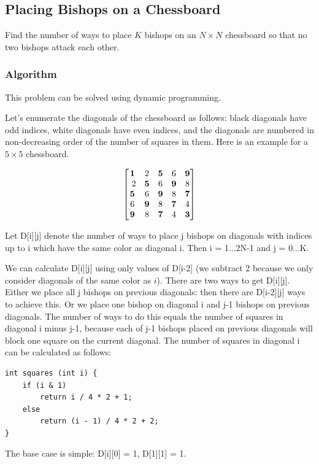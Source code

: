 \documentclass[8pt, a4paper, oneside, twocolumn]{extarticle}
\begin{document}
\subsection{Placing Bishops on a Chessboard}

Find the number of ways to place $K$ bishops on an $N \times N$ chessboard so that no two bishops attack each other.
\subsubsection{Algorithm}

This problem can be solved using dynamic programming.

Let's enumerate the diagonals of the chessboard as follows: black diagonals have odd indices, white diagonals have even indices, and the diagonals are numbered in non-decreasing order of the number of squares in them. Here is an example for a $5 \times 5$ chessboard.

\[\begin{bmatrix} \bf{1} & 2 & \bf{5} & 6 & \bf{9} \\\
2 & \bf{5} & 6 & \bf{9} & 8 \\
\bf{5} & 6 & \bf{9} & 8 & \bf{7} \\
6 & \bf{9} & 8 & \bf{7} & 4 \\
\bf{9} & 8 & \bf{7} & 4 & \bf{3} \\
\end{bmatrix}\]

Let D[i][j] denote the number of ways to place j bishops on diagonals with indices up to i which have the same color as diagonal i. Then i = 1...2N-1 and j = 0...K.

We can calculate D[i][j] using only values of D[i-2] (we subtract 2 because we only consider diagonals of the same color as $i$). There are two ways to get D[i][j]. Either we place all j bishops on previous diagonals: then there are D[i-2][j] ways to achieve this. Or we place one bishop on diagonal i and j-1 bishops on previous diagonals. The number of ways to do this equals the number of squares in diagonal i minus j-1, because each of j-1 bishops placed on previous diagonals will block one square on the current diagonal. The number of squares in diagonal i can be calculated as follows:
\begin{verbatim}
int squares (int i) {
    if (i & 1)
        return i / 4 * 2 + 1;
    else
        return (i - 1) / 4 * 2 + 2;
}
\end{verbatim}
The base case is simple: D[i][0] = 1, D[1][1] = 1.
\end{document}
